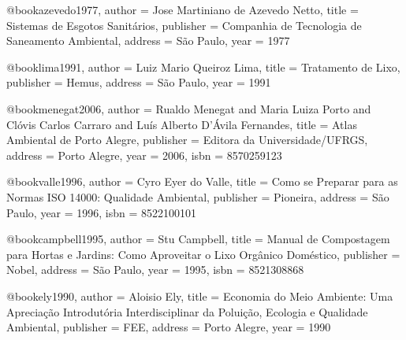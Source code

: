 @book{azevedo1977,
  author = {Jose Martiniano de Azevedo Netto},
  title = {Sistemas de Esgotos Sanitários},
  publisher = {Companhia de Tecnologia de Saneamento Ambiental},
  address = {São Paulo},
  year = {1977}
}

@book{lima1991,
  author = {Luiz Mario Queiroz Lima},
  title = {Tratamento de Lixo},
  publisher = {Hemus},
  address = {São Paulo},
  year = {1991}
}

@book{menegat2006,
  author = {Rualdo Menegat and Maria Luiza Porto and Clóvis Carlos Carraro and Luís Alberto D'Ávila Fernandes},
  title = {Atlas Ambiental de Porto Alegre},
  publisher = {Editora da Universidade/UFRGS},
  address = {Porto Alegre},
  year = {2006},
  isbn = {8570259123}
}

@book{valle1996,
  author = {Cyro Eyer do Valle},
  title = {Como se Preparar para as Normas ISO 14000: Qualidade Ambiental},
  publisher = {Pioneira},
  address = {São Paulo},
  year = {1996},
  isbn = {8522100101}
}

@book{campbell1995,
  author = {Stu Campbell},
  title = {Manual de Compostagem para Hortas e Jardins: Como Aproveitar o Lixo Orgânico Doméstico},
  publisher = {Nobel},
  address = {São Paulo},
  year = {1995},
  isbn = {8521308868}
}

@book{ely1990,
  author = {Aloisio Ely},
  title = {Economia do Meio Ambiente: Uma Apreciação Introdutória Interdisciplinar da Poluição, Ecologia e Qualidade Ambiental},
  publisher = {FEE},
  address = {Porto Alegre},
  year = {1990}
}

